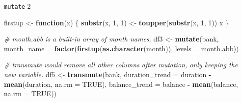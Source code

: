 \documentclass[
  10pt,
  ignorenonframetext,
  serif]{beamer}
\newenvironment{Shaded}{\begin{snugshade}}{\end{snugshade}}
\newcommand{\CommentTok}[1]{\textcolor[rgb]{0.56,0.35,0.01}{\textit{#1}}}
\newcommand{\ControlFlowTok}[1]{\textcolor[rgb]{0.13,0.29,0.53}{\textbf{#1}}}
\newcommand{\DataTypeTok}[1]{\textcolor[rgb]{0.13,0.29,0.53}{#1}}
\newcommand{\DecValTok}[1]{\textcolor[rgb]{0.00,0.00,0.81}{#1}}
\newcommand{\KeywordTok}[1]{\textcolor[rgb]{0.13,0.29,0.53}{\textbf{#1}}}
\newcommand{\NormalTok}[1]{#1}
\newcommand{\OperatorTok}[1]{\textcolor[rgb]{0.81,0.36,0.00}{\textbf{#1}}}
\newcommand{\OtherTok}[1]{\textcolor[rgb]{0.56,0.35,0.01}{#1}}
\newcommand{\StringTok}[1]{\textcolor[rgb]{0.31,0.60,0.02}{#1}}
\begin{document}
\begin{frame}[fragile]{\texttt{mutate} 2}
\protect\hypertarget{mutate-2}{}
\begin{Shaded}
\begin{Highlighting}[]
\NormalTok{firstup \textless{}{-}}\StringTok{ }\ControlFlowTok{function}\NormalTok{(x) \{}
  \KeywordTok{substr}\NormalTok{(x, }\DecValTok{1}\NormalTok{, }\DecValTok{1}\NormalTok{) \textless{}{-}}\StringTok{ }\KeywordTok{toupper}\NormalTok{(}\KeywordTok{substr}\NormalTok{(x, }\DecValTok{1}\NormalTok{, }\DecValTok{1}\NormalTok{))}
\NormalTok{  x}
\NormalTok{\}}

\CommentTok{\# month.abb is a built{-}in array of month names.}
\NormalTok{df3 \textless{}{-}}\StringTok{ }\KeywordTok{mutate}\NormalTok{(bank, }\DataTypeTok{month\_name =} \KeywordTok{factor}\NormalTok{(}\KeywordTok{firstup}\NormalTok{(}\KeywordTok{as.character}\NormalTok{(month)), }\DataTypeTok{levels =}\NormalTok{ month.abb))}

\CommentTok{\# transmute would remove all other columns after mutation, only keeping the new variable.}
\NormalTok{df5 \textless{}{-}}\StringTok{ }\KeywordTok{transmute}\NormalTok{(bank, }
                  \DataTypeTok{duration\_trend =}\NormalTok{ duration }\OperatorTok{{-}}\StringTok{ }\KeywordTok{mean}\NormalTok{(duration, }\DataTypeTok{na.rm =} \OtherTok{TRUE}\NormalTok{),}
                  \DataTypeTok{balance\_trend =}\NormalTok{ balance }\OperatorTok{{-}}\StringTok{ }\KeywordTok{mean}\NormalTok{(balance, }\DataTypeTok{na.rm =} \OtherTok{TRUE}\NormalTok{))}
\end{Highlighting}
\end{Shaded}
\end{frame}
\end{document}
